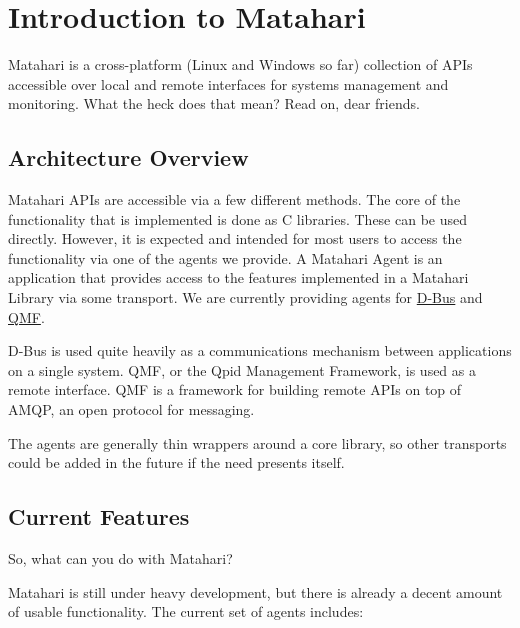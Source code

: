 \section{Introduction to Matahari}

Matahari is a cross-platform (Linux and Windows so far) collection of APIs accessible over local and remote interfaces for systems management and monitoring. What the heck does that mean? Read on, dear friends.

\subsection{Architecture Overview}

Matahari APIs are accessible via a few different methods. The core of the functionality that is implemented is done as C libraries. These can be used directly. However, it is expected and intended for most users to access the functionality via one of the agents we provide. A Matahari Agent is an application that provides access to the features implemented in a Matahari Library via some transport. We are currently providing agents for \href{http://www.freedesktop.org/wiki/Software/dbus}{D-Bus} and \href{http://qpid.apache.org/}{QMF}.

D-Bus is used quite heavily as a communications mechanism between applications on a single system. QMF, or the Qpid Management Framework, is used as a remote interface. QMF is a framework for building remote APIs on top of AMQP, an open protocol for messaging.

The agents are generally thin wrappers around a core library, so other transports could be added in the future if the need presents itself. 

\subsection{Current Features}

So, what can you do with Matahari?

Matahari is still under heavy development, but there is already a decent amount of usable functionality. The current set of agents includes:

